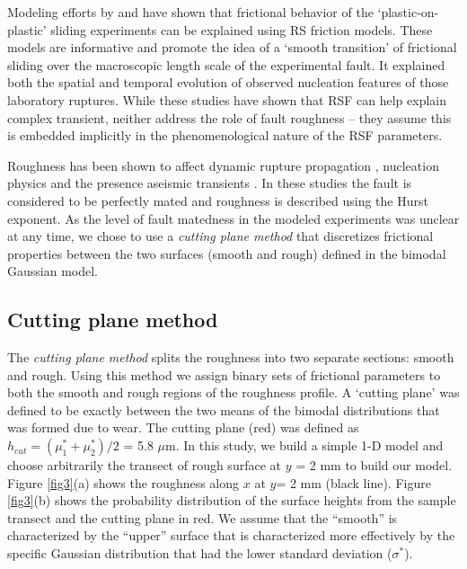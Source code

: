 \documentclass[preprint,1p, 10pt,authoryear]{elsarticle}
\begin{document}
Modeling efforts by \citet{Kaneko2011} and \citet{Kaneko2016} have shown that frictional behavior of the `plastic-on-plastic' sliding experiments can be explained using RS friction models. These models are informative and promote the idea of a `smooth transition' of frictional sliding over the macroscopic length scale of the experimental fault. It explained both the spatial and temporal evolution of observed nucleation features of those laboratory ruptures. While these studies have shown that RSF can help explain complex transient, neither address the role of fault roughness -- they assume this is embedded implicitly in the phenomenological nature of the RSF parameters.

Roughness has been shown to affect dynamic rupture propagation \citep[e.g.][]{Dunham2011, Fang2013}, nucleation physics \citep[e.g.][]{Tal2018} and the presence aseismic transients \citep{Ozawa2019}. In these studies the fault is considered to be perfectly mated and roughness is described using the Hurst exponent. As the level of fault matedness in the modeled experiments was unclear at any time, we chose to use a \textit{cutting plane method} that discretizes frictional properties between the two surfaces (smooth and rough) defined in the bimodal Gaussian model.

\subsection{Cutting plane method}
The \textit{cutting plane method} splits the roughness into two separate sections: smooth and rough. Using this method we assign binary sets of frictional parameters to both the smooth and rough regions of the roughness profile. A `cutting plane' was defined to be exactly between the two means of the bimodal distributions that was formed due to wear. The cutting plane (red) was defined as $h_{cut} = \left(\mu^{*}_{1}+\mu^{*}_{2} \right)/2$ = 5.8 $\mu$m.  In this study, we build a simple 1-D model and choose arbitrarily the transect of rough surface at $y$ = 2 mm to build our model. Figure \ref{fig3}(a) shows the roughness along $x$ at $y$= 2 mm (black line). Figure \ref{fig3}(b) shows the probability distribution of the surface heights from the sample transect and the cutting plane in red. We assume that the ``smooth'' is characterized by the ``upper'' surface that is characterized more effectively by the specific Gaussian distribution that had the lower standard deviation ($\sigma^{*}$).
\end{document}
